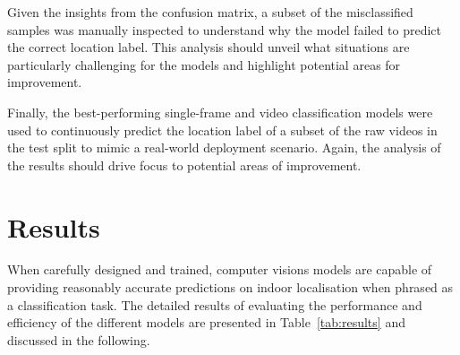 \documentclass[a4paper]{article}
\begin{document}
Given the insights from the confusion matrix, a subset of the misclassified
samples was manually inspected to understand why the model failed to predict the
correct location label. This analysis should unveil what situations are
particularly challenging for the models and highlight potential areas for
improvement.

Finally, the best-performing single-frame and video classification models were
used to continuously predict the location label of a subset of the raw videos in
the test split to mimic a real-world deployment scenario. Again, the analysis of
the results should drive focus to potential areas of improvement.



\section{Results} %
\label{sec:results}


When carefully designed and trained, computer visions models are capable of
providing reasonably accurate predictions on indoor localisation when phrased as
a classification task. The detailed results of evaluating the performance and
efficiency of the different models are presented in Table~\ref{tab:results} and
discussed in the following.
\end{document}
